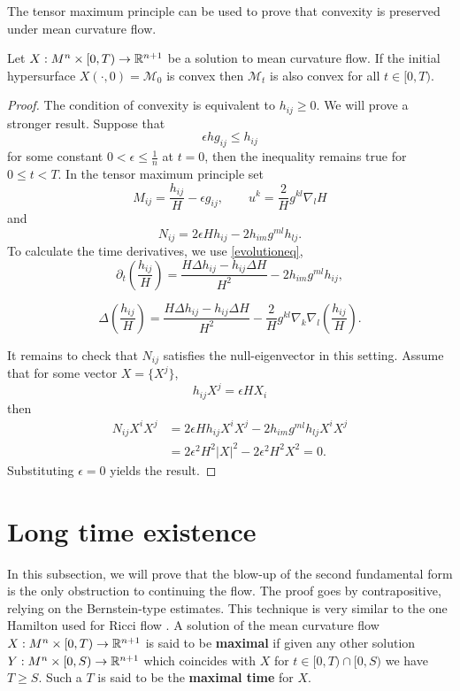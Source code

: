 The tensor maximum principle can be used to prove that convexity is preserved under mean curvature flow. 

\begin{lemma}
    Let $ X: M^{n} \times [0, T) \to \mathbb{R}^{n+1} $ be a solution to mean curvature flow. If the initial hypersurface $ X(\cdot, 0) = \mathcal{M}_{0}$ is convex then $ \mathcal{M}_{t} $ is also convex for all $ t \in [0,T) $.
\end{lemma}
\begin{proof}
    The condition of convexity is equivalent to $ h_{ij} \ge 0 $. We will prove a stronger result. Suppose that 
    \[ \epsilon h g_{ij} \le h_{ij} \]
    for some constant $ 0 < \epsilon \le \frac{1}{n} $ at $ t = 0 $, then the inequality remains true for $ 0 \le t <T $. In the tensor maximum principle set 
    \[ M_{ij} = \frac{h_{ij}}{H} - \epsilon g_{ij}, \qquad u^{k} = \frac{2}{H}g^{kl} \nabla_{l}H \]
    and 
    \[ N_{ij} = 2 \epsilon H h_{ij} - 2h_{im}g^{ml}h_{lj}. \]
    To calculate the time derivatives, we use \cref{evolutioneq}, 
    \[ \partial_{t}\left( \frac{h_{ij}}{H} \right) = \frac{H \Delta h_{ij}- h_{ij}\Delta H}{H^{2}} - 2h_{im}g^{ml}h_{ij},  \]
    
    \[ \Delta \left( \frac{h_{ij}}{H} \right)  = \frac{H \Delta h_{ij}- h_{ij} \Delta H }{H^{2}} - \frac{2}{H}g^{kl}\nabla_{k
    }\nabla_{l}\left( \frac{h_{ij}}{H}\right).\]


    It remains to check that $ N_{ij} $ satisfies the null-eigenvector in this setting. Assume that for some vector $ X = \{X^{j}\} $, 
    \[ h_{ij}  X^{j} = \epsilon HX_{i} \]
    then \begin{align*}
        N_{ij}X^{i}X^{j} & = 2 \epsilon H h_{ij}X^{i}X^{j} - 2h_{im}g^{ml}h_{lj}X^{i}X^{j} \\
        & = 2 \epsilon^{2}H^{2}|X|^{2} - 2 \epsilon^{2}H^{2}X^{2} = 0. 
    \end{align*}
    Substituting $ \epsilon = 0 $ yields the result. 
\end{proof}


\section{Long time existence}\label{Longtime}

In this subsection, we will prove that the blow-up of the second fundamental form is the only obstruction to continuing the flow. The proof goes by contrapositive, relying on the Bernstein-type estimates. This technique is very similar to the one Hamilton used for Ricci flow \cite{hamilton1982three}. A solution of the mean curvature flow $ X : M^{n} \times [0,T) \to \mathbb{R}^{n+1} $ is said to be \textbf{maximal}  if given any other solution $ Y : M^{n} \times [0,S) \to \mathbb{R}^{n+1} $ which coincides with $ X $ for $ t \in [0,T) \cap [0,S) $ we have $ T \ge S $. Such a $ T $ is said to be the \textbf{maximal time} for $ X $. 

